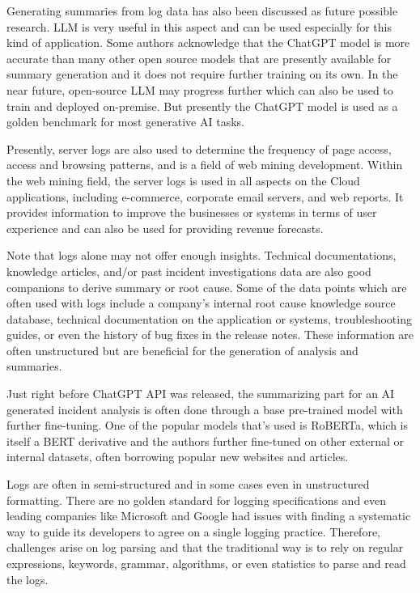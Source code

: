 \documentclass[conference]{IEEEtran}
\begin{document}
Generating summaries from log data has also been discussed as future possible research. LLM is very useful in this aspect and can be used especially for this kind of application. Some authors acknowledge that the ChatGPT model is more accurate than many other open source models that are presently available for summary generation and it does not require further training on its own. In the near future, open-source LLM may progress further which can also be used to train and deployed on-premise. But presently the ChatGPT model is used as a golden benchmark for most generative AI tasks.\cite{bendimerad2023onpremise}

Presently, server logs are also used to determine the frequency of page access, access and browsing patterns, and is a field of web mining development. Within the web mining field, the server logs is used in all aspects on the Cloud applications, including e-commerce, corporate email servers, and web reports. It provides information to improve the businesses or systems in terms of user experience and can also be used for providing revenue forecasts. \cite{9898279}

Note that logs alone may not offer enough insights. Technical documentations, knowledge articles, and/or past incident investigations data are also good companions to derive summary or root cause. Some of the data points which are often used with logs include a company's internal root cause knowledge source database, technical documentation on the application or systems, troubleshooting guides, or even the history of bug fixes in the release notes. These information are often unstructured but are beneficial for the generation of analysis and summaries. \cite{saha2022mining}

Just right before ChatGPT API was released, the summarizing part for an AI generated incident analysis is often done through a base pre-trained model with further fine-tuning. One of the popular models that's used is RoBERTa, which is itself a BERT derivative and the authors further fine-tuned on other external or internal datasets, often borrowing popular new websites and articles. \cite{saha2022mining}

Logs are often in semi-structured and in some cases even in unstructured formatting. There are no golden standard for logging specifications and even leading companies like Microsoft and Google had issues with finding a systematic way to guide its developers to agree on a single logging practice. Therefore, challenges arise on log parsing and that the traditional way is to rely on regular expressions, keywords, grammar, algorithms, or even statistics to parse and read the logs. \cite{survey-log-aiops}
\end{document}
